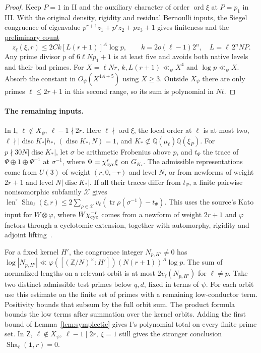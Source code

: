 \documentclass[letterpaper,11pt]{article}
\newcommand{\QQ}{\mathbb Q}
\newcommand{\ZZ}{\mathbb Z}
\newcommand{\Sha}{\operatorname{Sha}}
\newcommand{\len}{\operatorname{len}}
\newcommand{\ord}{\operatorname{ord}}
\newcommand{\leanrange}[4]{\href{https://github.com/leanprover-community/riemann-hypothesis/blob/40e56bab026552e089d7afcfeff08d2defb9c005/#1\#L#2-L#3}{#4}}
\begin{document}
\begin{proof}
Keep \(P=1\) in II and the auxiliary character of order \(\ord\xi\) at \(P=p_1\) in III. With the original density, rigidity and residual Bernoulli inputs, the Siegel congruence of eigenvalue \(p^{r+1}z_1+p^rz_2+pz_3+1\) gives finiteness and the \leanrange{src/Development/AutomorphicArithmetic/AutomorphicVarieties/ModularityArgument/ThresholdArguments/DenseThresholdCases/CountS.lean}{14}{18}{preliminary count}
\[
 z_\ell(\xi,r)\le2Ck[L(r+1)]^A\log p,\qquad
 k=2o(\ell-1)2^n,\quad L=\ell\,2^nNP .
\]
Any prime divisor \(p\) of \(6\ell Np_1+1\) is at least five and avoids both native levels and their bad primes. For \(X=\ell Nr\), \(k,L(r+1)\ll_\psi X^4\) and \(\log p\ll_\psi X\). Absorb the constant in \(O_\psi(X^{4A+5})\) using \(X\ge3\). Outside \(X_\psi\) there are only primes \(\ell\le2r+1\) in this second range, so its sum is polynomial in \(Nt\).
\end{proof}

\paragraph{The remaining inputs.}
In I, \(\ell\notin X_\psi,\ \ell-1\nmid2r\). Here \(\ell\nmid\ord\xi\), the local order at \(\ell\) is at most two, \(\ell\nmid|\operatorname{disc}K_*|h_*\), \((\operatorname{disc}K_*,N)=1\), and \(K_*\not\subset\QQ(\mu_\ell)\QQ(\xi_P)\). For \(p\nmid30N|\operatorname{disc}K_*|\), let \(\sigma\) be arithmetic Frobenius above \(p\), and \(t_\Psi\) the trace of \(\Psi\oplus1\oplus\Psi^{-1}\) at \(\sigma^{-1}\), where \(\Psi=\chi_{\rm cyc}^r\xi\) on \(G_{K_*}\). The admissible representations come from \(U(3)\) of weight \((r,0,-r)\) and level \(N\), or from newforms of weight \(2r+1\) and level \(N|\operatorname{disc}K_*|\). If all their traces differ from \(t_\Psi\), a finite pairwise nonisomorphic subfamily \(\mathcal X\) gives
\(\len^\circ\Sha_\ell(\xi,r)\le2\sum_{\rho\in\mathcal X}v_\ell(\operatorname{tr}\rho(\sigma^{-1})-t_\Psi)\).
This uses the source's Kato input for \(W\otimes\varphi\), where \(W\chi_{\rm cyc}^{-r}\) comes from a newform of weight \(2r+1\) and \(\varphi\) factors through a cyclotomic extension, together with automorphy, rigidity and adjoint lifting~\cite{kato}.

For a fixed kernel \(H'\), the congruence integer \(N_{p,H'}\ne0\) has
\(\log|N_{p,H'}|\ll\varphi([(\ZZ/N)^\times:H'])(N(r+1))^A\log p\).
The sum of normalized lengths on a relevant orbit is at most \(2v_\ell(N_{p,H'})\) for \(\ell\ne p\). Take two distinct admissible test primes below \(q,d\), fixed in terms of \(\psi\). For each orbit use this estimate on the finite set of primes with a remaining low-conductor term. Positivity bounds that subsum by the full orbit sum. The product formula bounds the low terms after summation over the kernel orbits. Adding the first bound of Lemma~\ref{lem:symplectic} gives I's polynomial total on every finite prime set. In Z, \(\ell\notin X_\psi,\ \ell-1\mid2r,\ \xi=1\) still gives the stronger conclusion \(\Sha_\ell(\mathbf1,r)=0\).
\end{document}
